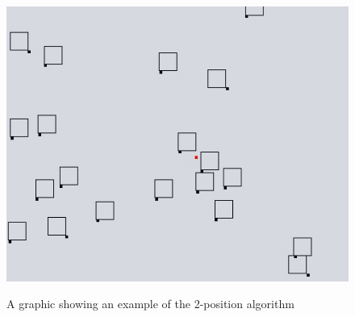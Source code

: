 \documentclass[crop=false,a4paper,oneside,11pt]{standalone}
\begin{document}
\begin{figure}[h!]
\centering
  \includegraphics[scale = 0.5]{2pos_example.JPG}\\
  \caption{A graphic showing an example of the 2-position algorithm}
 \end{figure}
\end{document}
